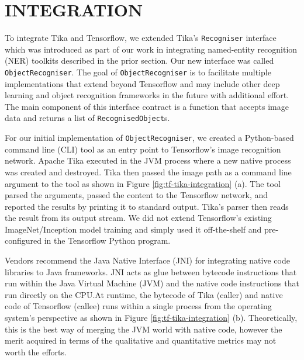 
\section{INTEGRATION} \label{sec:integration}
To integrate Tika and Tensorflow, we extended Tika's \texttt{Recogniser} interface which was introduced as part of our work in integrating named-entity recognition (NER) toolkits described in the prior section. Our new interface was called \texttt{ObjectRecogniser}. The goal of \texttt{ObjectRecogniser} is to facilitate multiple implementations that extend beyond Tensorflow and may include other deep learning and object recognition frameworks in the future with additional effort. The main component of this interface contract is a function that accepts image data and returns a list of \texttt{RecognisedObject}s.

For our initial implementation of \texttt{ObjectRecogniser}, we created a Python-based command line (CLI) tool as an entry point to Tensorflow's image recognition network. 
Apache Tika executed in the JVM process where a new native process was created and destroyed. Tika then passed the image path as a command line argument to the tool as shown in Figure \ref{fig:tf-tika-integration} (a). The tool parsed the arguments, passed the content to the Tensorflow network, and reported the results by printing it to standard output. Tika's parser then reads the result from its output stream. We did not extend Tensorflow's existing ImageNet/Inception model training and simply used it off-the-shelf and pre-configured in the Tensorflow Python program.

Vendors recommend the Java Native Interface (JNI) for integrating native code libraries to Java frameworks\cite{gordon1998essential}. JNI acts as glue between bytecode instructions that run within the Java Virtual Machine (JVM) and the native code instructions that run directly on the CPU.At runtime, the bytecode of Tika (caller) and native code of Tensorflow (callee) runs within a single process from the operating system's perspective as shown in Figure \ref{fig:tf-tika-integration} (b). Theoretically, this is the best way of merging the JVM world with native code, however the merit acquired in terms of the qualitative and quantitative metrics may not worth the efforts.

